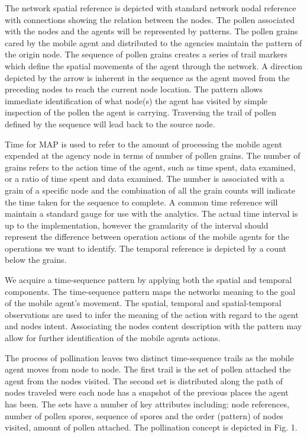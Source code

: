 \documentclass{acm_proc_article-sp}
\begin{document}
The network spatial reference is depicted with standard network nodal reference with connections showing the relation between the nodes.  The pollen associated with the nodes and the agents will be represented by patterns. The pollen grains cared by the mobile agent and distributed to the agencies maintain the pattern of the origin node.  The sequence of pollen grains creates a series of trail markers which define the spatial movements of the agent through the network.  A direction depicted by the arrow is inherent in the sequence as the agent moved from the preceding nodes to reach the current node location. The pattern allows immediate identification of what node(s) the agent has visited by simple inspection of the pollen the agent is carrying. Traversing the trail of pollen defined by the sequence will lead back to the source node.

Time for MAP is used to refer to the amount of processing the mobile agent expended at the agency node in terms of number of pollen grains. The number of grains refers to the action time of the agent, such as time spent, data examined, or a ratio of time spent and data examined.  The number is associated with a grain of a specific node and the combination of all the grain counts will indicate the time taken for the sequence to complete. A common time reference will maintain a standard gauge for use with the analytics. The actual time interval is up to the implementation, however the granularity of the interval should represent the difference between operation actions of the mobile agents for the operations we want to identify.  The temporal reference is depicted by a count below the grains.

We acquire a time-sequence pattern by applying both the spatial and temporal components.  The time-sequence pattern maps the networks meaning to the goal of the mobile agent's movement.  The spatial, temporal and spatial-temporal observations are used to infer the meaning of the action with regard to the agent and nodes intent. Associating the nodes content description with the pattern may allow for further identification of the mobile agents actions.  

The process of pollination leaves two distinct time-sequence trails as the mobile agent moves from node to node. The first trail is the set of pollen attached the agent from the nodes visited. The second set is distributed along the path of nodes traveled were each node has a snapshot of the previous places the agent has been. The sets have a number of key attributes including: node references, number of pollen spores, sequence of spores and the order (pattern) of nodes visited, amount of pollen attached. The pollination concept is depicted in Fig. 1.
\end{document}
